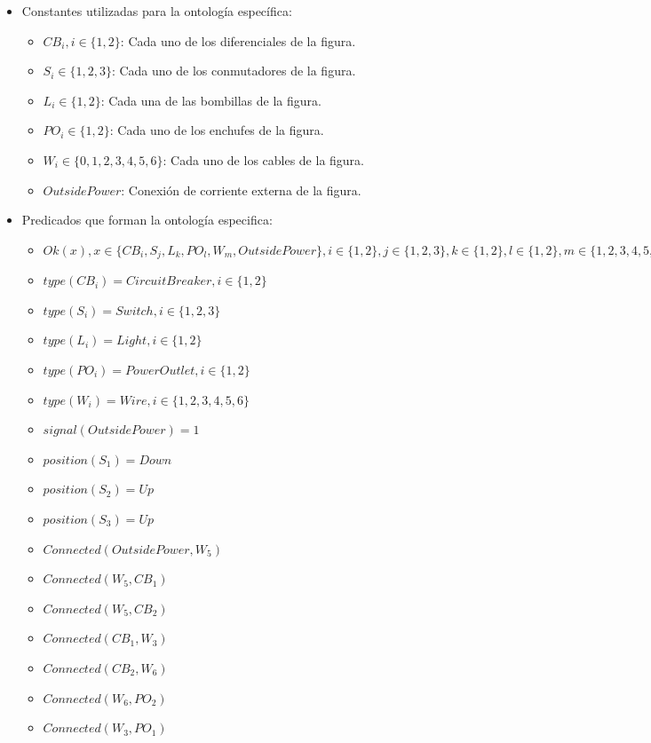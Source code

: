 \documentclass[10pt, a4paper,spanish]{article}
\begin{document}
			\begin{itemize}

				\item Constantes utilizadas para la ontología específica:
				\begin{itemize}
					\item $CB_i, i \in \{1,2\}$: Cada uno de los diferenciales de la figura.
					\item $S_i \in \{1,2,3\}$:  Cada uno de los conmutadores de la figura.
					\item $L_i \in \{1,2\}$: Cada una de las bombillas de la figura.
					\item $PO_i \in \{1,2\}$: Cada uno de los enchufes de la figura.
					\item $W_i \in \{0,1,2,3,4,5,6\}$: Cada uno de los cables de la figura.
					\item $OutsidePower$: Conexión de corriente externa de la figura.
				\end{itemize}
				\item Predicados que forman la ontología especifica:
				\begin{itemize}
					\item $ Ok(x),  x \in \{CB_i, S_j, L_k, PO_l, W_m, OutsidePower\}, i \in \{1,2\}, j \in \{1,2,3\},k \in \{1,2\},l \in \{1,2\},m \in \{1,2,3,4,5,6\}$
					\item $ type(CB_i) = CircuitBreaker, i \in \{1,2\} $
					\item $ type(S_i) = Switch, i \in \{1,2, 3\} $
					\item $ type(L_i) = Light, i \in \{1,2\} $
					\item $ type(PO_i) = PowerOutlet, i \in \{1,2\} $
					\item $ type(W_i) = Wire, i \in \{1,2, 3, 4, 5, 6\} $
					\item $ signal(OutsidePower) = 1 $
					\item $ position(S_1) = Down $
					\item $ position(S_2) = Up $
					\item $ position(S_3) = Up $
					\item $ Connected(OutsidePower, W_5)$
					\item $ Connected(W_5, CB_1)$
					\item $ Connected(W_5, CB_2)$
					\item $ Connected(CB_1, W_3)$
					\item $ Connected(CB_2, W_6)$
					\item $ Connected(W_6, PO_2)$
					\item $ Connected(W_3, PO_1)$

\end{itemize}
\end{itemize}
\end{document}
